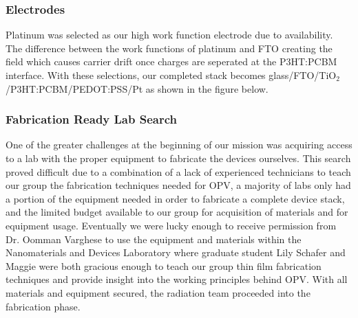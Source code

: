 \subsubsection{Electrodes}
	
	Platinum was selected as our high work function electrode due to availability. The difference between the work functions of platinum and FTO creating the field which causes carrier drift once charges are seperated at the P3HT:PCBM interface. With these selections, our completed stack becomes \linebreak glass/FTO/TiO$_2$/P3HT:PCBM/PEDOT:PSS/Pt as shown in the figure below. \\
	
\subsubsection{Fabrication Ready Lab Search}
	
	One of the greater challenges at the beginning of our mission was acquiring access to a lab with the proper equipment to fabricate the devices ourselves. This search proved difficult due to a combination of a lack of experienced technicians to teach our group the fabrication techniques needed for OPV, a majority of labs only had a portion of the equipment needed in order to fabricate a complete device stack, and the limited budget available to our group for acquisition of materials and for equipment usage. Eventually we were lucky enough to receive permission from Dr. Oomman Varghese to use the equipment and materials within the Nanomaterials and Devices Laboratory where graduate student Lily Schafer and Maggie were both gracious enough to teach our group thin film fabrication techniques  and provide insight into the working principles behind OPV. With all materials and equipment secured, the radiation team proceeded into the fabrication phase. \\
